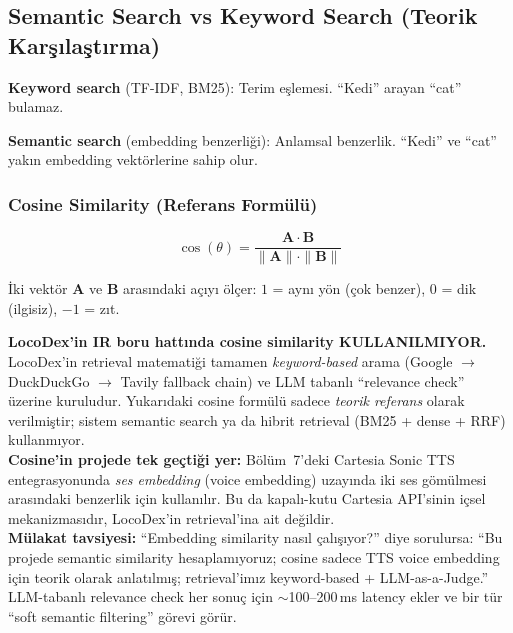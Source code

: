 \subsection{Semantic Search vs Keyword Search (Teorik Kar\c{s}{\i}la\c{s}t{\i}rma)}
\label{subsec:semantic-search}

\textbf{Keyword search} (TF-IDF, BM25): Terim e\c{s}lemesi. ``Kedi'' arayan ``cat'' bulamaz.

\textbf{Semantic search} (embedding benzerli\u{g}i): Anlamsal benzerlik. ``Kedi'' ve ``cat'' yak{\i}n embedding vekt\"{o}rlerine sahip olur.

\subsubsection{Cosine Similarity (Referans Form\"{u}l\"{u})}

\begin{equation}
\cos(\theta) = \frac{\mathbf{A} \cdot \mathbf{B}}{\|\mathbf{A}\| \cdot \|\mathbf{B}\|}
\label{eq:cosine}
\end{equation}

\noindent
\.{I}ki vekt\"{o}r $\mathbf{A}$ ve $\mathbf{B}$ aras{\i}ndaki a\c{c}{\i}y{\i} \"{o}l\c{c}er: $1$ = ayn{\i} y\"{o}n (\c{c}ok benzer), $0$ = dik (ilgisiz), $-1$ = z{\i}t.

\begin{dikkat}
\textbf{LocoDex'in IR boru hatt{\i}nda cosine similarity KULLANILMIYOR.} LocoDex'in retrieval matemati\u{g}i tamamen \emph{keyword-based} arama (Google $\to$ DuckDuckGo $\to$ Tavily fallback chain) ve LLM tabanl{\i} ``relevance check'' \"{u}zerine kuruludur. Yukar{\i}daki cosine form\"{u}l\"{u} sadece \emph{teorik referans} olarak verilmi\c{s}tir; sistem semantic search ya da hibrit retrieval (BM25 + dense + RRF) kullanm{\i}yor. \\

\textbf{Cosine'in projede tek ge\c{c}ti\u{g}i yer:} B\"{o}l\"{u}m~7'deki Cartesia Sonic TTS entegrasyonunda \emph{ses embedding} (voice embedding) uzay{\i}nda iki ses g\"{o}m\"{u}lmesi aras{\i}ndaki benzerlik i\c{c}in kullan{\i}l{\i}r. Bu da kapal{\i}-kutu Cartesia API'sinin i\c{c}sel mekanizmas{\i}d{\i}r, LocoDex'in retrieval'{i}na ait de\u{g}ildir. \\

\textbf{M\"{u}lakat tavsiyesi:} ``Embedding similarity nas{\i}l \c{c}al{\i}\c{s}{\i}yor?'' diye sorulursa: ``Bu projede semantic similarity hesaplam{\i}yoruz; cosine sadece TTS voice embedding i\c{c}in teorik olarak anlat{\i}lm{\i}\c{s}; retrieval'{i}m{\i}z keyword-based + LLM-as-a-Judge.'' \\

LLM-tabanl{\i} relevance check her sonu\c{c} i\c{c}in $\sim$100--200\,ms latency ekler ve bir t\"{u}r ``soft semantic filtering'' g\"{o}revi g\"{o}r\"{u}r.
\end{dikkat}



